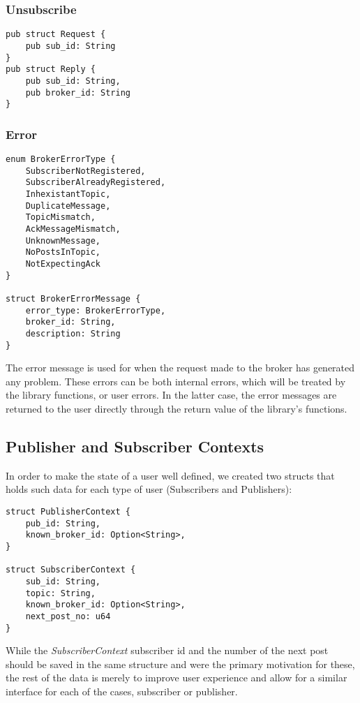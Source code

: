 \subsubsection{Unsubscribe}

\begin{lstlisting}
pub struct Request {
    pub sub_id: String
}
pub struct Reply {
    pub sub_id: String,
    pub broker_id: String
}
\end{lstlisting}

\subsubsection{Error}

\begin{lstlisting}
enum BrokerErrorType {
    SubscriberNotRegistered,
    SubscriberAlreadyRegistered,
    InhexistantTopic,
    DuplicateMessage,
    TopicMismatch,
    AckMessageMismatch,
    UnknownMessage,
    NoPostsInTopic,
    NotExpectingAck
}

struct BrokerErrorMessage {
    error_type: BrokerErrorType,
    broker_id: String,
    description: String
}
\end{lstlisting}
The error message is used for when the request made to the broker has generated any problem. These errors can be both internal errors, which will be treated by the library functions, or user errors. In the latter case, the error messages are returned to the user directly through the return value of the library's functions.

\subsection{Publisher and Subscriber Contexts}

In order to make the state of a user well defined, we created two structs that holds such data for each type of user (Subscribers and Publishers):

\begin{lstlisting}
struct PublisherContext {
    pub_id: String,
    known_broker_id: Option<String>,
}

struct SubscriberContext {
    sub_id: String,
    topic: String,
    known_broker_id: Option<String>,
    next_post_no: u64
}
\end{lstlisting}

While the \emph{SubscriberContext} subscriber id and the number of the next post should be saved in the same structure and were the primary motivation for these, the rest of the data is merely to improve user experience and allow for a similar interface for each of the cases, subscriber or publisher.


